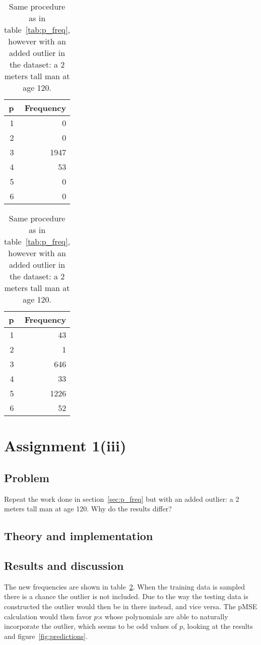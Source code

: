 \documentclass[11pt, a4paper]{article}
\begin{document}
\begin{table}
	\parbox{.45\linewidth}{
		\centering
		\caption{Frequencies of ``winning'' models with $p = \text{\numrange{1}{6}}$ across \num{2e4} attempts. \label{tab:p_freq}}
		\begin{tabular}{r@{\hskip 0.8in}r}\toprule
			\centering p & \centering Frequency \tabularnewline \midrule
			1 & 0 \\
			2 & 0 \\
			3 & 1947 \\
			4 & 53 \\
			5 & 0 \\
			6 & 0 \\ \bottomrule
		\end{tabular}
		}
		\hfill
		\parbox{.45\linewidth}{
			\centering
			\caption{Same procedure as in table~\ref{tab:p_freq}, however with an added outlier in the dataset:
			a 2 meters tall man at age 120. \label{tab:p_freq_outlier}}
			\begin{tabular}{r@{\hskip 0.8in}r}\toprule
				\centering p & \centering Frequency \tabularnewline \midrule
				1 & 43 \\
				2 & 1 \\
				3 & 646 \\
				4 & 33 \\
				5 & 1226 \\
				6 & 52 \\ \bottomrule
			\end{tabular}
			}
\end{table}

\section{Assignment 1(iii)}
\subsection{Problem}
Repeat the work done in section~\ref{sec:p_freq} but with an added outlier:
a 2 meters tall man at age 120.
Why do the results differ?
\subsection{Theory and implementation}
\subsection{Results and discussion}
The new frequencies are shown in table~\ref{tab:p_freq_outlier}.
When the training data is sampled there is a chance the outlier is not included.
Due to the way the testing data is constructed the outlier would then be in there instead,
and vice versa.
The pMSE calculation would then favor $p$:s whose polynomials are able to naturally
incorporate the outlier,
which seems to be odd values of $p$, looking at the results and figure~\ref{fig:predictions}.
\end{document}
